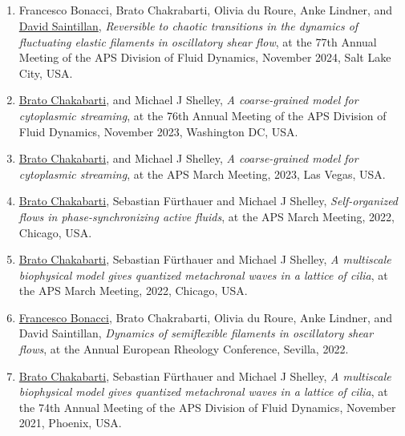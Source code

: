 \documentclass[10pt]{res} %
\begin{document}
\begin{resume}
\section{} 
\vspace*{8mm}
\begin{enumerate}
\item  {Francesco Bonacci}, Brato Chakrabarti, Olivia du Roure, Anke Lindner, and \underline{David Saintillan}, \textit{Reversible to chaotic transitions in the dynamics of fluctuating elastic filaments in oscillatory shear flow}, at the 77th Annual Meeting of the APS Division of Fluid Dynamics, November 2024, Salt Lake City, USA.
	
\item  \underline{Brato Chakabarti}, and Michael J Shelley, \textit{A coarse-grained model for cytoplasmic streaming}, at the 76th Annual Meeting of the APS Division of Fluid Dynamics, November 2023, Washington DC, USA.

\item  \underline{Brato Chakabarti}, and Michael J Shelley, \textit{A coarse-grained model for cytoplasmic streaming}, at the APS March Meeting, 2023, Las Vegas, USA.

\item  \underline{Brato Chakabarti}, Sebastian F\"{u}rthauer and Michael J Shelley, \textit{Self-organized flows in phase-synchronizing active fluids}, at the APS March Meeting, 2022, Chicago, USA.
	
\item  \underline{Brato Chakabarti}, Sebastian F\"{u}rthauer and Michael J Shelley, \textit{A multiscale biophysical model gives quantized metachronal waves in a lattice of cilia}, at the APS March Meeting, 2022, Chicago, USA.
	
\item \underline{Francesco Bonacci}, Brato Chakrabarti, Olivia du Roure, Anke Lindner, and David Saintillan, \textit{Dynamics of semiflexible filaments in oscillatory shear flows}, at the Annual European Rheology Conference, Sevilla, 2022.

\item  \underline{Brato Chakabarti}, Sebastian F\"{u}rthauer and Michael J Shelley, \textit{A multiscale biophysical model gives quantized metachronal waves in a lattice of cilia}, at the 74th Annual Meeting of the APS Division of Fluid Dynamics, November 2021, Phoenix, USA.


\end{enumerate}
\end{resume}
\end{document}
